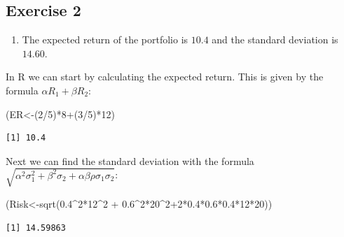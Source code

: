\documentclass[
  letterpaper,
  DIV=11,
  numbers=noendperiod]{scrreprt}
\newenvironment{Shaded}{\begin{snugshade}}{\end{snugshade}}
\newcommand{\DecValTok}[1]{\textcolor[rgb]{0.68,0.00,0.00}{#1}}
\newcommand{\FloatTok}[1]{\textcolor[rgb]{0.68,0.00,0.00}{#1}}
\newcommand{\FunctionTok}[1]{\textcolor[rgb]{0.28,0.35,0.67}{#1}}
\newcommand{\NormalTok}[1]{\textcolor[rgb]{0.00,0.23,0.31}{#1}}
\newcommand{\OtherTok}[1]{\textcolor[rgb]{0.00,0.23,0.31}{#1}}
\newcommand{\SpecialCharTok}[1]{\textcolor[rgb]{0.37,0.37,0.37}{#1}}
\providecommand{\tightlist}{%
  \setlength{\itemsep}{0pt}\setlength{\parskip}{0pt}}\usepackage{longtable,booktabs,array}
\begin{document}
\hypertarget{exercise-2-17}{%
\subsection*{Exercise 2}\label{exercise-2-17}}

\begin{enumerate}
\def\labelenumi{\arabic{enumi}.}
\tightlist
\item
  The expected return of the portfolio is \(10.4\) and the standard
  deviation is \(14.60\).
\end{enumerate}

In R we can start by calculating the expected return. This is given by
the formula \(\alpha R_{1} +\beta R_{2}\):

\begin{Shaded}
\begin{Highlighting}[numbers=left,,]
\NormalTok{(ER}\OtherTok{\textless{}{-}}\NormalTok{(}\DecValTok{2}\SpecialCharTok{/}\DecValTok{5}\NormalTok{)}\SpecialCharTok{*}\DecValTok{8}\SpecialCharTok{+}\NormalTok{(}\DecValTok{3}\SpecialCharTok{/}\DecValTok{5}\NormalTok{)}\SpecialCharTok{*}\DecValTok{12}\NormalTok{)}
\end{Highlighting}
\end{Shaded}

\begin{verbatim}
[1] 10.4
\end{verbatim}

Next we can find the standard deviation with the formula
\(\sqrt{\alpha^2 \sigma_{1}^2+\beta^2 \sigma_{2}+\alpha \beta \rho \sigma_{1} \sigma_{2}}\):

\begin{Shaded}
\begin{Highlighting}[numbers=left,,]
\NormalTok{(Risk}\OtherTok{\textless{}{-}}\FunctionTok{sqrt}\NormalTok{(}\FloatTok{0.4}\SpecialCharTok{\^{}}\DecValTok{2}\SpecialCharTok{*}\DecValTok{12}\SpecialCharTok{\^{}}\DecValTok{2} \SpecialCharTok{+} \FloatTok{0.6}\SpecialCharTok{\^{}}\DecValTok{2}\SpecialCharTok{*}\DecValTok{20}\SpecialCharTok{\^{}}\DecValTok{2}\SpecialCharTok{+}\DecValTok{2}\SpecialCharTok{*}\FloatTok{0.4}\SpecialCharTok{*}\FloatTok{0.6}\SpecialCharTok{*}\FloatTok{0.4}\SpecialCharTok{*}\DecValTok{12}\SpecialCharTok{*}\DecValTok{20}\NormalTok{))}
\end{Highlighting}
\end{Shaded}

\begin{verbatim}
[1] 14.59863
\end{verbatim}
\end{document}
